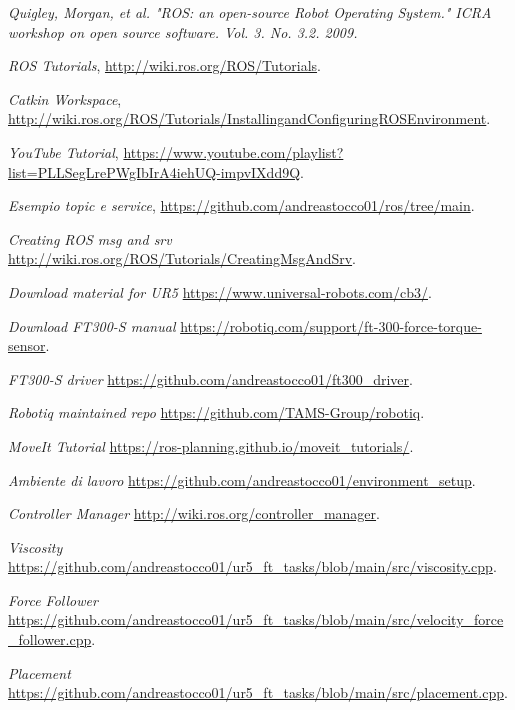 \begin{thebibliography}{99}

 \textit{Quigley, Morgan, et al. "ROS: an open-source Robot Operating System." ICRA workshop on open source software. 
Vol. 3. No. 3.2. 2009.}

 \textit{ROS Tutorials}, \url{http://wiki.ros.org/ROS/Tutorials}.

 \textit{Catkin Workspace}, \url{http://wiki.ros.org/ROS/Tutorials/InstallingandConfiguringROSEnvironment}.

 \textit{YouTube Tutorial}, \url{https://www.youtube.com/playlist?list=PLLSegLrePWgIbIrA4iehUQ-impvIXdd9Q}.

 \textit{Esempio topic e service}, \url{https://github.com/andreastocco01/ros/tree/main}.

 \textit{Creating ROS msg and srv} \url{http://wiki.ros.org/ROS/Tutorials/CreatingMsgAndSrv}.

 \textit{Download material for UR5} \url{https://www.universal-robots.com/cb3/}.

 \textit{Download FT300-S manual} \url{https://robotiq.com/support/ft-300-force-torque-sensor}.

 \textit{FT300-S driver} \url{https://github.com/andreastocco01/ft300_driver}.

 \textit{Robotiq maintained repo} \url{https://github.com/TAMS-Group/robotiq}.

 \textit{MoveIt Tutorial} \url{https://ros-planning.github.io/moveit_tutorials/}.

 \textit{Ambiente di lavoro} \url{https://github.com/andreastocco01/environment_setup}.

 \textit{Controller Manager} \url{http://wiki.ros.org/controller_manager}.

 \textit{Viscosity} \url{https://github.com/andreastocco01/ur5_ft_tasks/blob/main/src/viscosity.cpp}. 

 \textit{Force Follower} \url{https://github.com/andreastocco01/ur5_ft_tasks/blob/main/src/velocity_force_follower.cpp}.

 \textit{Placement} \url{https://github.com/andreastocco01/ur5_ft_tasks/blob/main/src/placement.cpp}.

\end{thebibliography}